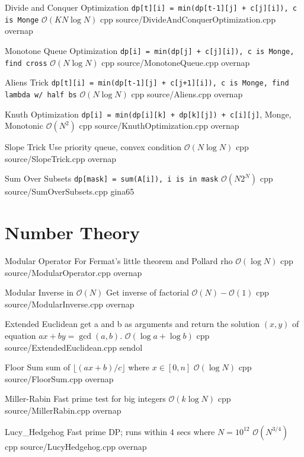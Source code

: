 \documentclass[landscape, 10pt, a4paper, oneside, twocolumn]{extarticle}
\begin{document}
\Algorithm
{Divide and Conquer Optimization}
{\texttt{dp[t][i] = min(dp[t-1][j] + c[j][i]), c is Monge}}
{$\mathcal{O}(KN\log{N})$}
{cpp}
{source/DivideAndConquerOptimization.cpp}
{overnap}

\Algorithm
{Monotone Queue Optimization}
{\texttt{dp[i] = min(dp[j] + c[j][i]), c is Monge, find cross}}
{$\mathcal{O}(N\log{N})$}
{cpp}
{source/MonotoneQueue.cpp}
{overnap}

\Algorithm
{Aliens Trick}
{\texttt{dp[t][i] = min(dp[t-1][j] + c[j+1][i]), c is Monge, find lambda w/ half bs}}
{$\mathcal{O}(N\log{N})$}
{cpp}
{source/Aliens.cpp}
{overnap}

\Algorithm
{Knuth Optimization}
{\texttt{dp[i] = min(dp[i][k] + dp[k][j]) + c[i][j]}, Monge, Monotonic}
{$\mathcal{O}(N^2)$}
{cpp}
{source/KnuthOptimization.cpp}
{overnap}

\Algorithm
{Slope Trick}
{Use priority queue, convex condition}
{$\mathcal{O}(N\log{N})$}
{cpp}
{source/SlopeTrick.cpp}
{overnap}

\Algorithm
{Sum Over Subsets}
{\texttt{dp[mask] = sum(A[i]), i is in mask}}
{$\mathcal{O}(N2^N)$}
{cpp}
{source/SumOverSubsets.cpp}
{gina65}


\section{Number Theory}

\Algorithm
{Modular Operator}
{For Fermat's little theorem and Pollard rho}
{$\mathcal{O}(\log{N})$}
{cpp}
{source/ModularOperator.cpp}
{overnap}

\Algorithm
{Modular Inverse in $\mathcal{O}(N)$}
{Get inverse of factorial}
{$\mathcal{O}(N)-\mathcal{O}(1)$}
{cpp}
{source/ModularInverse.cpp}
{overnap}

\Algorithm
{Extended Euclidean}
{get a and b as arguments and return the solution $(x, y)$ of equation $ax + by = \gcd(a, b)$.}
{$\mathcal{O}(\log{a} + \log{b})$}
{cpp}
{source/ExtendedEuclidean.cpp}
{sendol}

\Algorithm
{Floor Sum}
{sum of $\lfloor(ax + b)/c\rfloor$ where $x \in [0, n]$}
{$\mathcal{O}(\log{N})$}
{cpp}
{source/FloorSum.cpp}
{overnap}

\Algorithm
{Miller-Rabin}
{Fast prime test for big integers}
{$\mathcal{O}(k\log{N})$}
{cpp}
{source/MillerRabin.cpp}
{overnap}

\Algorithm
{Lucy\_Hedgehog}
{Fast prime DP; runs within 4 secs where $N=10^{12}$}
{$\mathcal{O}(N^{3/4})$}
{cpp}
{source/LucyHedgehog.cpp}
{overnap}
\end{document}
